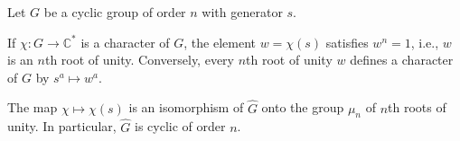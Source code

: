 Let $G$ be a cyclic group of order $n$ with generator $s$.

If $\chi \colon G \to \mathbb{C}^*$ is a character of $G$, the element $w = \chi(s)$ satisfies $w^n = 1$, i.e., $w$ is an $n$th root of unity. Conversely, every $n$th root of unity $w$ defines a character of $G$ by $s^a \mapsto w^a$.

The map $\chi \mapsto \chi(s)$ is an isomorphism of $\widehat{G}$ onto the group $\mu_n$ of $n$th roots of unity. In particular, $\widehat{G}$ is cyclic of order $n$.
